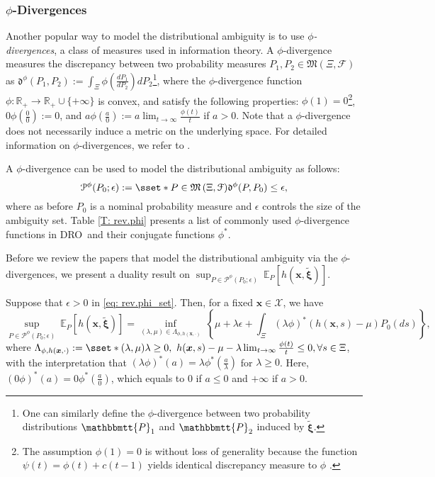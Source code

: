 \documentclass[final,onefignum,onetabnum]{class}
\newcommand{\ee}[2]{\mathbb{E}_{#1} \left[ #2 \right]}
\newcommand{\bs}[1]{\boldsymbol{#1}} %
\newcommand{\Bs}[1]{\mathbb{#1}} %
\newcommand{\Ts}[1]{\mathbbmtt{#1}} %
\newcommand{\Cs}[1]{\mathcal{#1}} %
\newcommand{\Fs}[1]{\mathfrak{#1}} %
\newcommand{\txi}{\tilde{\bs{\xi}}}
\newcommand{\measurespace}{\left( \Xi, \Cs{F} \right)}
\newcommand{\dro}{DRO}
\begin{document}
\subsubsection[Phi-Divergences]{\texorpdfstring{$\phi$-Divergences}{Phi-Divergences}}
\label{sec: rev.phi}
Another popular way to model the distributional ambiguity is to use {\it $\phi$-divergences}, a  class of measures used in information theory.
A $\phi$-divergence measures the discrepancy between two probability measures $P_{1}, P_{2} \in \Fs{M}\measurespace$  as $\Fs{d}^{\phi}(P_{1}, P_{2}):=\int_{\Xi}\phi\left(\frac{d P_{1}}{d P_{2}}\right) d P_{2}$\footnote{One can similarly define the $\phi$-divergence between  two probability distributions $\Ts{P}_{1}$ and $\Ts{P}_{2}$ induced by $\txi$.}, where the $\phi$-divergence function $\phi : \Bs{R}_{+} \rightarrow \Bs{R}_{+} \cup \{+ \infty\}$ is convex, and satisfy the following properties: $\phi(1)=0$\footnote{The assumption $\phi(1)=0$ is without loss of generality because the function $\psi(t)= \phi(t)+ c (t-1)$ yields  identical discrepancy measure to $\phi$ \cite{pardo2005}.}, $0\phi\left(\frac{0}{0}\right):=0$, and $a\phi\left(\frac{a}{0}\right):=a \lim_{t \rightarrow \infty} \frac{\phi(t)}{t}$ if $a>0$. Note that a  $\phi$-divergence does not necessarily induce a metric on the underlying space. For detailed information on  $\phi$-divergences, we refer to \citet{read1988,vajda1989,pardo2005}.  


A $\phi$-divergence can be used to model the distributional ambiguity as follows:
\begin{equation}
\label{eq: rev.phi_set}
\Cs{P}^{\phi}(P_{0};\epsilon):= \sset*{P \in \Fs{M}\measurespace}{ \Fs{d}^{\phi}(P, P_{0}) \le \epsilon},
\end{equation}
where as before $P_{0}$ is a nominal probability measure and $\epsilon$ controls the size of the ambiguity set. Table \ref{T: rev.phi} presents a list of commonly used $\phi$-divergence functions in \dro\ and their conjugate functions $\phi^{*}$. 

Before we review the papers that model the distributional ambiguity via the $\phi$-divergences, we present a  duality result on $\sup_{P \in \Cs{P}^{\phi}(P_{0};\epsilon)} \ \ee{P}{h(\bs{x},\txi)}$. 

\begin{theorem}
    \label{thm: rev.phi_duality} 
    Suppose that $\epsilon >0$ in \eqref{eq: rev.phi_set}. Then, for a fixed $\bs{x} \in \Cs{X}$, we have 
    $$\sup_{P \in \Cs{P}^{\phi}(P_{0};\epsilon)} \ \ee{P}{h(\bs{x},\txi)} = \inf_{(\lambda, \mu) \in \Lambda_{\phi,h(\bs{x}, \cdot)} } \  \left\lbrace  \mu + \lambda \epsilon +  \int_{\Xi} (\lambda\phi)^{*}( h(\bs{x}, s) -\mu )  P_{0}(ds) \right\rbrace,$$
    where $\Lambda_{\phi,h(\bs{x}, \cdot)}:=\sset*{(\lambda, \mu)}{\lambda \ge 0, \ h(\bs{x}, s) -\mu -\lambda \lim_{t \rightarrow \infty} \frac{\phi(t)}{t} \le 0, \forall  s \in \Xi}$, with the interpretation that $(\lambda\phi)^{*}(a)=\lambda\phi^{*}(\frac{a}{\lambda})$ for $\lambda \ge 0$. Here, $(0\phi)^{*}(a)=0\phi^{*}(\frac{a}{0})$, which equals to  $0$ if $a\le 0 $ and $+\infty$ if $a>0$. 
\end{theorem}
\end{document}

